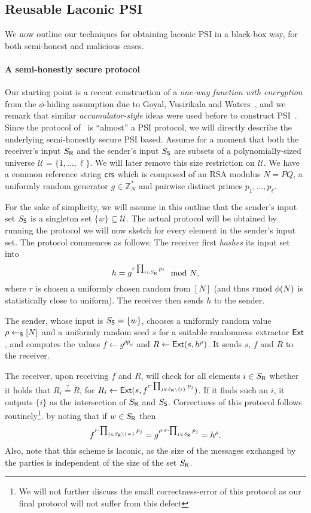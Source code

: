 \subsection{Reusable Laconic PSI}

We now outline our techniques for obtaining   laconic PSI in a black-box way, for both semi-honest and malicious cases.

\paragraph{A semi-honestly secure protocol}
Our starting point is a recent construction of a \emph{one-way function with encryption} from the $\phi$-hiding assumption due to Goyal, Vusirikala and Waters~\cite{C:GoyVusWat20}, and we remark that similar \emph{accumulator-style} ideas were used before to construct PSI~\cite{PKC:AteDeCTsu11}. Since the protocol of~\cite{C:GoyVusWat20} is ``almost'' a PSI protocol, we will directly describe the underlying semi-honestly secure PSI based. Assume for a moment that both the receiver's input $S_{\mathsf{R}}$ and the sender's input $S_{\mathsf{S}}$ are subsets of a polynomially-sized universe $\mathcal{U} = \{1,\dots,\ell\}$. We will later remove this size restriction on $\mathcal{U}$. We have a common reference string $\mathsf{crs}$ which is composed of an RSA modulus $N = PQ$, a uniformly random generator $g \in \mathbb{Z}_N^\ast$ and pairwise distinct primes $p_1,\dots,p_\ell$. 

For the sake of simplicity, we will assume in this outline that the sender's input set $S_{\mathsf{S}}$ is a singleton set $\{ w \} \subseteq \mathcal{U}$. The actual protocol will be obtained by running the protocol we will now sketch for every element in the sender's input set. The protocol commences as follows: The receiver first \emph{hashes} its input set into
\[
h=g^{r\prod_{i \in S_{\mathsf{R}}} p_i} \mod N,
\]
where $r$ is chosen a uniformly chosen random from $[N]$ (and thus $r \!\!\!\!\mod \phi(N)$ is statistically close to uniform). The receiver then sends $h$ to the sender.

The sender, whose input is $S_{\mathsf{S}} = \{ w \}$, chooses a uniformly random value $\rho \leftarrow_\$ [N]$ and a uniformly random seed $s$ for a suitable randomness extractor $\mathsf{Ext}$, and computes the values $f \gets g^{\rho p_w}$ and $R \gets \mathsf{Ext}(s,h^\rho)$. It sends $s$, $f$ and $R$ to the receiver.

The receiver, upon receiving $f$ and $R$, will check for all elements $i \in S_{\mathsf{R}}$ whether it holds that $R_i \stackrel{?}{=} R$, for $R_i \gets \mathsf{Ext}(s,f^{r \cdot \prod_{j \in S_{\mathsf{R}} \setminus \{ i \} } p_j})$. If it finds such an $i$, it outputs $\{ i \}$ as the intersection of $S_{\mathsf{R}}$ and $S_{\mathsf{S}}$. Correctness of this protocol follows routinely\footnote{We will not further discuss the small correctness-error of this protocol as our final protocol will not suffer from this defect}. by noting that if $w \in S_{\mathsf{R}}$ then $$f^{r \cdot \prod_{j \in S_{\mathsf{R}} \setminus \{ w \} } p_j} = g^{\rho \cdot r \cdot \prod_{j \in S_{\mathsf{R}}} p_j } = h^\rho.$$ Also, note that this scheme is laconic, as the size of the messages exchanged by the parties is independent of the size of the set $S_{\mathsf{R}}$.

